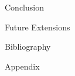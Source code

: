 \documentclass[twoside, a4paper, titlepage]{article}
\begin{document}
\newpage
\begin{section}{Conclusion}

\end{section}

\newpage
\begin{section}{Future Extensions}

\end{section}

\newpage
\begin{section}{Bibliography}

\end{section}

\newpage
\begin{section}{Appendix}

\end{section}

\end{document}
